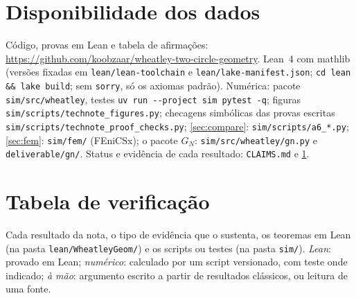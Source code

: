 \documentclass[11pt,a4paper]{article}
\theoremstyle{plain}
\theoremstyle{remark}
\newcommand{\repourl}{\url{https://github.com/koobzaar/wheatley-two-circle-geometry}}
\begin{document}
\section*{Disponibilidade dos dados}
{\raggedright
Código, provas em Lean e tabela de afirmações: \repourl. Lean~4 com mathlib (versões fixadas em \texttt{lean/lean-toolchain} e
\texttt{lean/lake-manifest.json}; \texttt{cd lean \&\& lake build}; sem \texttt{sorry}, só os axiomas padrão). Numérica: pacote
\texttt{sim/src/wheatley}, testes \texttt{uv run -{}-project sim pytest -q}; figuras \texttt{sim/scripts/technote\_figures.py};
checagens simbólicas das provas escritas \texttt{sim/scripts/technote\_proof\_checks.py}; \cref{sec:compare}:
\texttt{sim/scripts/a6\_*.py}; \cref{sec:fem}: \texttt{sim/fem/} (FEniCSx); o pacote $G_N$: \texttt{sim/src/wheatley/gn.py} e
\texttt{deliverable/gn/}. Status e evidência de cada resultado: \texttt{CLAIMS.md} e \cref{app:verification}.\par}




\appendix
\section{Tabela de verificação}\label{app:verification}
Cada resultado da nota, o tipo de evidência que o sustenta, os teoremas em Lean (na pasta \texttt{lean/WheatleyGeom/}) e
os scripts ou testes (na pasta \texttt{sim/}). \emph{Lean}: provado em Lean; \emph{numérico}: calculado por um script versionado, com teste onde
indicado; \emph{à mão}: argumento escrito a partir de resultados clássicos, ou leitura de uma fonte.
{\small}
\end{document}
